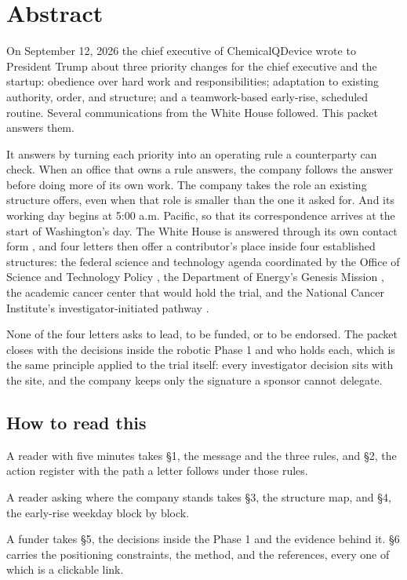 \section*{Abstract}

On September 12, 2026 the chief executive of ChemicalQDevice wrote to President
Trump about three priority changes for the chief executive and the startup: obedience over
hard work and responsibilities; adaptation to existing authority, order, and
structure; and a teamwork-based early-rise, scheduled routine. Several
communications from the White House followed. This packet answers them.

It answers by turning each priority into an operating rule a counterparty can
check. When an office that owns a rule answers, the company follows the answer
before doing more of its own work. The company takes the role an existing
structure offers, even when that role is smaller than the one it asked for. And
its working day begins at 5:00 a.m. Pacific, so that its correspondence arrives
at the start of Washington's day. The White House is answered through its own
contact form \cite{whcontact2026}, and four letters then offer a contributor's
place inside four established structures: the federal science and technology
agenda coordinated by the Office of Science and Technology Policy
\cite{ostp2026}, the Department of Energy's Genesis Mission
\cite{eo14363genesismission}, the academic cancer center that would hold the
trial, and the National Cancer Institute's investigator-initiated pathway
\cite{ctep2026}.

None of the four letters asks to lead, to be funded, or to be endorsed. The
packet closes with the decisions inside the robotic Phase 1 and who holds each,
which is the same principle applied to the trial itself: every investigator
decision sits with the site, and the company keeps only the signature a sponsor
cannot delegate.

\subsection*{How to read this}

A reader with five minutes takes \S1, the message and the three rules, and \S2,
the action register with the path a letter follows under those rules.

A reader asking where the company stands takes \S3, the structure map, and \S4,
the early-rise weekday block by block.

A funder takes \S5, the decisions inside the Phase 1 and the evidence behind it.
\S6 carries the positioning constraints, the method, and the references, every
one of which is a clickable link.
